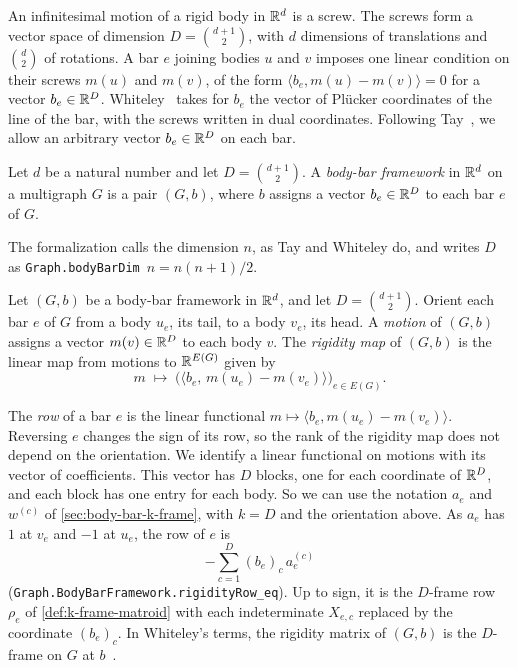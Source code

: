 An infinitesimal motion of a rigid body in ${\mathbb{R}}^d$ is a screw. The
screws form a vector space of dimension $D = \binom{d+1}{2}$, with $d$
dimensions of translations and $\binom{d}{2}$ of rotations. A bar $e$
joining bodies $u$ and $v$ imposes one linear condition on their screws
$m(u)$ and $m(v)$, of the form $\langle b_e, m(u) - m(v) \rangle = 0$
for a vector $b_e \in {\mathbb{R}}^D$. Whiteley~\cite[\S3]{whiteley1988} takes
for $b_e$ the vector of Pl\"ucker coordinates of the line of the bar,
with the screws written in dual coordinates. Following
Tay~\cite[Definition~5.1]{tay1984}, we allow an arbitrary vector
$b_e \in {\mathbb{R}}^D$ on each bar.

\begin{definition}
  \label{def:body-bar-framework}
  \leanok
  Let $d$ be a natural number and let $D = \binom{d+1}{2}$. A
  \emph{body-bar framework} in ${\mathbb{R}}^d$ on a multigraph $G$ is a pair
  $(G, b)$, where $b$ assigns a vector $b_e \in {\mathbb{R}}^D$ to each bar $e$
  of $G$.
\end{definition}
\begin{fmlnote}
  The formalization calls the dimension $n$, as Tay and Whiteley do, and
  writes $D$ as \texttt{Graph.bodyBarDim}~$n = n(n+1)/2$.
\end{fmlnote}

\begin{definition}
  \label{def:rigidity-map-body-bar}
  \leanok
  Let $(G, b)$ be a body-bar framework in ${\mathbb{R}}^d$, and let
  $D = \binom{d+1}{2}$. Orient each bar $e$ of $G$ from a body $u_e$, its
  tail, to a body $v_e$, its head. A \emph{motion} of $(G, b)$ assigns a vector $m(v) \in {\mathbb{R}}^D$ to each
  body $v$. The \emph{rigidity map} of $(G, b)$ is the linear map from
  motions to ${\mathbb{R}}^{E(G)}$ given by
  \[
    m \;\longmapsto\;
    \bigl(\langle b_e,\, m(u_e) - m(v_e) \rangle\bigr)_{e \in E(G)}.
  \]
\end{definition}

The \emph{row} of a bar $e$ is the linear functional
$m \mapsto \langle b_e, m(u_e) - m(v_e) \rangle$. Reversing $e$ changes
the sign of its row, so the rank of the rigidity map does not depend on
the orientation. We identify a linear functional on motions with its
vector of coefficients. This vector has $D$ blocks, one for each
coordinate of ${\mathbb{R}}^D$, and each block has one entry for each body. So we
can use the notation $a_e$ and $w^{(c)}$ of \cref{sec:body-bar-k-frame},
with $k = D$ and the orientation above. As $a_e$ has $1$ at $v_e$ and
$-1$ at $u_e$, the row of $e$ is
\[
  -\sum_{c = 1}^{D} (b_e)_c\, a_e^{(c)}
\]
(\texttt{Graph.\allowbreak{}BodyBarFramework.\allowbreak{}rigidityRow\_\allowbreak{}eq}).
Up to sign, it is the $D$-frame row $\rho_e$ of
\cref{def:k-frame-matroid} with each indeterminate $X_{e,c}$ replaced
by the coordinate $(b_e)_c$. In Whiteley's terms, the rigidity matrix
of $(G, b)$ is the $D$-frame on $G$ at $b$~\cite[\S3]{whiteley1988}.

